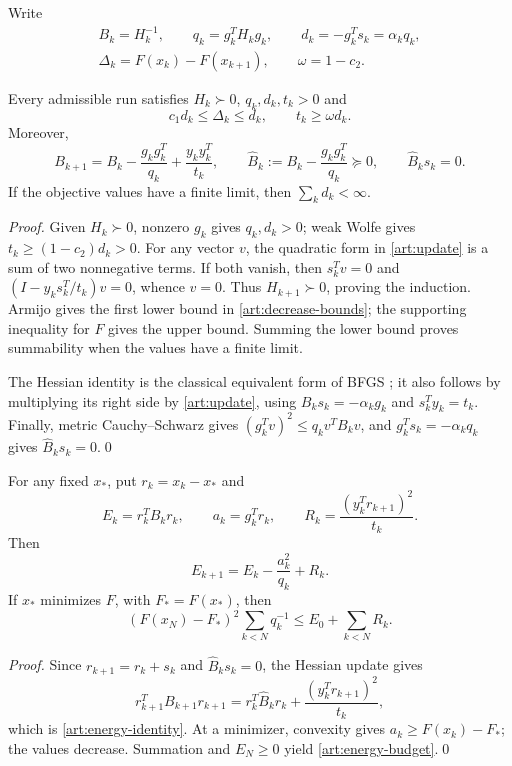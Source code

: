 Write
\[
 \begin{gathered}
 B_k=H_k^{-1},\qquad q_k=g_k^TH_kg_k,\qquad
 d_k=-g_k^Ts_k=\alpha_kq_k,\\
 \Delta_k=F(x_k)-F(x_{k+1}),\qquad \omega=1-c_2.
 \end{gathered}
\]
\begin{lemma}\label{art:run-invariants}
Every admissible run satisfies $H_k\succ0$, $q_k,d_k,t_k>0$ and
\begin{equation}\label{art:decrease-bounds}
 c_1d_k\le\Delta_k\le d_k,\qquad t_k\ge\omega d_k.
\end{equation}
Moreover,
\begin{equation}\label{art:hessian-update}
 B_{k+1}=B_k-\frac{g_kg_k^T}{q_k}+\frac{y_ky_k^T}{t_k},
 \qquad \widehat B_k:=B_k-\frac{g_kg_k^T}{q_k}\succeq0,
 \qquad \widehat B_ks_k=0.
\end{equation}
If the objective values have a finite limit, then $\sum_kd_k<\infty$.
\end{lemma}
\begin{proof}
Given $H_k\succ0$, nonzero $g_k$ gives $q_k,d_k>0$; weak Wolfe gives
$t_k\ge(1-c_2)d_k>0$. For any vector $v$, the quadratic form in
\eqref{art:update} is a sum of two nonnegative terms. If both vanish, then
$s_k^Tv=0$ and $(I-y_ks_k^T/t_k)v=0$, whence $v=0$.
Thus $H_{k+1}\succ0$, proving the induction. Armijo gives the first lower
bound in \eqref{art:decrease-bounds}; the supporting inequality for $F$ gives
the upper bound. Summing the lower bound proves summability when the values
have a finite limit.

The Hessian identity is the classical equivalent form of BFGS
\cite[Section~5]{FND_N92}; it also follows by multiplying its right side by
\eqref{art:update}, using $B_ks_k=-\alpha_kg_k$ and $s_k^Ty_k=t_k$.
Finally, metric Cauchy--Schwarz gives
$(g_k^Tv)^2\le q_kv^TB_kv$, and
$g_k^Ts_k=-\alpha_kq_k$ gives $\widehat B_ks_k=0$.\qed
\end{proof}

\begin{lemma}\label{art:reference-energy}
For any fixed $x_*$, put $r_k=x_k-x_*$ and
\[
 E_k=r_k^TB_kr_k,\qquad a_k=g_k^Tr_k,\qquad
 R_k=\frac{(y_k^Tr_{k+1})^2}{t_k}.
\]
Then
\begin{equation}\label{art:energy-identity}
 E_{k+1}=E_k-\frac{a_k^2}{q_k}+R_k.
\end{equation}
If $x_*$ minimizes $F$, with $F_*=F(x_*)$, then
\begin{equation}\label{art:energy-budget}
 (F(x_N)-F_*)^2\sum_{k<N}q_k^{-1}
       \le E_0+\sum_{k<N}R_k.
\end{equation}
\end{lemma}
\begin{proof}
Since $r_{k+1}=r_k+s_k$ and $\widehat B_ks_k=0$, the Hessian update gives
\[
 r_{k+1}^TB_{k+1}r_{k+1}
 =r_k^T\widehat B_kr_k+\frac{(y_k^Tr_{k+1})^2}{t_k},
\]
which is \eqref{art:energy-identity}. At a minimizer, convexity gives
$a_k\ge F(x_k)-F_*$; the values decrease. Summation and $E_N\ge0$ yield
\eqref{art:energy-budget}.\qed
\end{proof}

